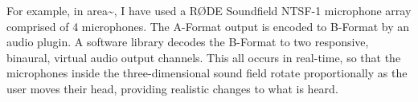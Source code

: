For example, in area\textasciitilde{}, I have used a RØDE Soundfield NTSF-1 microphone array comprised of 4 microphones. The A-Format output is encoded to B-Format by an audio plugin. A software library decodes the B-Format to two responsive, binaural, virtual audio output channels. This all occurs in real-time, so that the microphones inside the three-dimensional sound field rotate proportionally as the user moves their head, providing realistic changes to what is heard.


%
